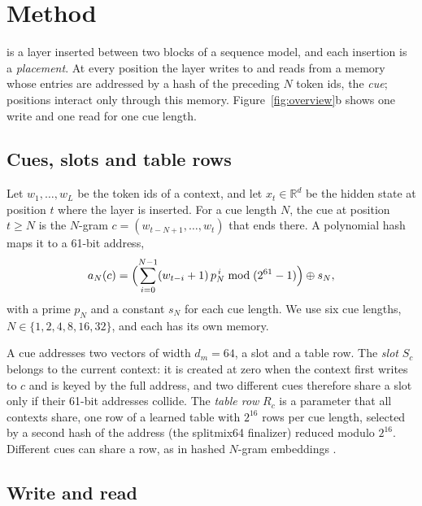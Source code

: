 \section{Method}
\label{sec:method}

\ingram{} is a layer inserted between two blocks of a sequence model, and each insertion is a
\emph{placement}. At every position the layer writes to and reads from a memory whose entries are
addressed by a hash of the preceding $N$ token ids, the \emph{cue}; positions interact only
through this memory. Figure~\ref{fig:overview}b shows one write and one read for one cue length.

\subsection{Cues, slots and table rows}
\label{sec:method-cues}

Let $w_1, \dots, w_L$ be the token ids of a context, and let $x_t \in \mathbb{R}^d$ be the hidden
state at position $t$ where the layer is inserted. For a cue length $N$, the cue at position
$t \ge N$ is the $N$-gram $c = (w_{t-N+1}, \dots, w_t)$ that ends there. A polynomial hash maps it
to a 61-bit address,
\begin{equation}
a_N(c) = \Bigl( \sum_{i=0}^{N-1} (w_{t-i} + 1)\, p_N^{\,i} \bmod (2^{61} - 1) \Bigr) \oplus s_N ,
\label{eq:hash}
\end{equation}
with a prime $p_N$ and a constant $s_N$ for each cue length. We use six cue lengths, $N \in \{1,
2, 4, 8, 16, 32\}$, and each has its own memory.

A cue addresses two vectors of width $d_m = 64$, a slot and a table row. The \emph{slot} $S_c$
belongs to the current context: it is created at zero when the context first writes to $c$ and is
keyed by the full address, and two different cues therefore share a slot only if their 61-bit
addresses collide. The \emph{table row} $R_c$ is a parameter that all contexts share, one row of a
learned table with $2^{16}$ rows per cue length, selected by a second hash of the address (the
splitmix64 finalizer) reduced modulo $2^{16}$. Different cues can
share a row, as in hashed $N$-gram embeddings \citep{engram2026}.

\subsection{Write and read}
\label{sec:method-rw}

